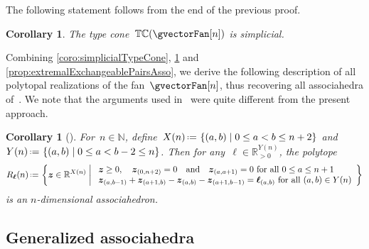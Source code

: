 \documentclass{amsart}
\newtheorem{corollary}[theorem]{Corollary}
\theoremstyle{definition}
\newcommand{\R}{\mathbb{R}} %
\newcommand{\N}{\mathbb{N}} %
\renewcommand{\b}[1]{{\boldsymbol{#1}}} %
\newcommand{\set}[2]{\left\{ #1 \;\middle|\; #2 \right\}} %
\newcommand{\bigset}[2]{\big\{ #1 \;\big|\; #2 \big\}} %
\newcommand{\eqdef}{\mbox{\,\raisebox{0.2ex}{\scriptsize\ensuremath{\mathrm:}}\ensuremath{=}\,}} %
\newcommand{\typeCone}{\mathbb{TC}} %
\begin{document}
The following statement follows from the end of the previous proof.

\begin{corollary}
\label{coro:simplicialTypeConeAsso}
The type cone~$\typeCone(\gvectorFan[n])$ is simplicial.
\end{corollary}

Combining \cref{coro:simplicialTypeCone}, \cref{coro:simplicialTypeConeAsso} and \cref{prop:extremalExchangeablePairsAsso}, we derive the following description of all polytopal realizations of the fan~$\gvectorFan[n]$, thus recovering all associahedra of~\cite[Sect.~3.2]{ArkaniHamedBaiHeYan}.
We note that the arguments used in~\cite[Sect.~3.2]{ArkaniHamedBaiHeYan} were quite different from the present approach.

\begin{corollary}[{\cite[Sect.~3.2]{ArkaniHamedBaiHeYan}}]
For~$n \in \N$, define~$X(n) \eqdef \set{(a,b)}{0 \le a < b \le n+2}$ and~$Y(n) \eqdef \set{(a,b)}{0 \le a < b-2 \le n}$.
Then for any~$\b{\ell} \in \R_{>0}^{Y(n)}$, the polytope
\[
R_\b{\ell}(n) \eqdef \set{\b{z} \in \R^{X(n)}}{\begin{array}{l} \b{z} \ge 0, \quad \b{z}_{(0,n+2)} = 0 \quad\text{and}\quad \b{z}_{(a,a+1)} = 0 \text{ for all } 0 \le a \le n+1 \\ \b{z}_{(a,b-1)} + \b{z}_{(a+1,b)} - \b{z}_{(a,b)} - \b{z}_{(a+1,b-1)} = \b{\ell}_{(a,b)} \text{ for all } (a,b) \in Y(n) \end{array}}
\]
is an $n$-dimensional associahedron.
\end{corollary}


\subsection{Generalized associahedra}
\end{document}
